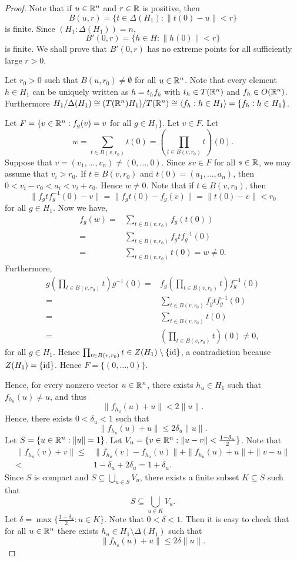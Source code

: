 \begin{proof}
Note that if $u\in \mathbb{R}^n$ and $r\in\mathbb{R}$ is positive, then
\[ B(u,r)=\{ t\in\Delta(H_1) : \| t(0)-u\|<r\}\]
is finite. Since $(H_1:\Delta(H_1))=n$,
\[B'(0,r)=\{ h\in H :  \| h(0)\|<r\}\]
is finite. We shall prove that $B'(0,r)$ has no extreme points for  all sufficiently large $r>0$. 

Let $r_0>0$ such that $B(u,r_0)\neq\emptyset$ for all $u\in\mathbb{R}^n$. Note that every element $h\in H_1$ can be uniquely written as $h=t_hf_h$ with $t_h\in T(\mathbb{R}^n)$ and $f_h\in O(\mathbb{R}^n)$. Furthermore $H_1/\Delta(H_1)\cong (T(\mathbb{R}^n)H_1)/T(\mathbb{R}^n)\cong \langle f_h :h\in H_1\rangle=\{ f_h : h\in H_1\}$. 

Let $F=\{ v\in \mathbb{R}^n : f_g(v)=v$ for all $ g\in H_1\}$. Let $v\in F$. Let 
\[w=\sum_{t\in B(v,r_0)}t(0)=\left(\prod_{t\in B(v,r_0)}t\right)(0).\] 
Suppose that $v=(v_1,\dots ,v_n)\neq (0,\dots ,0)$. Since $sv\in F$ for all $s\in \mathbb{R}$, we may assume that $v_i>r_0$. If $t\in B(v,r_0)$ and $t(0)=(a_1,\dots ,a_n)$, then $0<v_i-r_0<a_i<v_i+r_0$. Hence $w\neq 0$. Note that if $t\in B(v,r_0)$, then
\[\|f_gtf_g^{-1}(0)-v\|=\|f_gt(0)-f_g(v)\|=\|t(0)-v\|<r_0\]
for all $g\in H_1$.
Now we have,
\begin{align*}
    f_g(w)=&\sum_{t\in B(v,r_0)}f_g(t(0))\\
    =&\sum_{t\in B(v,r_0)}f_gtf_g^{-1}(0)\\
    =&\sum_{t\in B(v,r_0)}t(0)=w\neq 0.
\end{align*}
Furthermore,
\begin{align*}g\left(\prod_{t\in B(v,r_0)}t\right)g^{-1}(0)=&f_g\left(\prod_{t\in B(v,r_0)}t\right)f_g^{-1}(0)\\
=&\sum_{t\in B(v,r_0)}f_gtf_g^{-1}(0)\\
    =&\sum_{t\in B(v,r_0)}t(0)\\
=&\left(\prod_{t\in B(v,r_0)}t\right)(0)\neq 0,
\end{align*}
for all $g\in H_1$. Hence $\prod_{t\in B(v,r_0)}t\in Z(H_1)\setminus\{\operatorname{id}\}$, a contradiction because $Z(H_1)=\{ \operatorname{id}\}$. Hence $F=\{ (0,\dots ,0)\}$.

Hence, for every nonzero vector $u\in\mathbb{R}^n$, there exists $h_u\in H_1$ such that $f_{h_u}(u)\neq u$, and thus
\[ \|f_{h_u}(u)+u\|<2\|u\|.\]
Hence, there exists $0<\delta_u<1$ such that
\[\|f_{h_u}(u)+u\|\leq 2\delta_u\|u\|. \]
Let $S=\{ u\in \mathbb{R}^n : \| u\|=1\}$. Let $V_u=\{ v\in\mathbb{R}^n :\|u-v\|<\frac{1-\delta_u}{2} \}$. Note that
\begin{align*}\|f_{h_u}(v)+v \|\leq &\|f_{h_u}(v)-f_{h_u}(u)\|+\|f_{h_u}(u)+u\|+\|v-u\|\\
<& 1-\delta_u+2\delta_u=1+\delta_u.
\end{align*}
Since $S$ is compact and $S\subseteq\bigcup_{u\in S}V_u$, there exists a finite subset $K\subseteq S$ such that 
\[S\subseteq\bigcup_{u\in K}V_u.\]
Let $\delta=\max\{ \frac{1+\delta_u}{2} :u\in K\}$. Note that $0<\delta<1$. Then it is easy to check that for all $u\in \mathbb{R}^n$ there exists $h_u\in H_1\setminus\Delta(H_1)$ such that
\[ \|f_{h_u}(u)+u\|\leq 2\delta\| u\|.\]


\end{proof}
